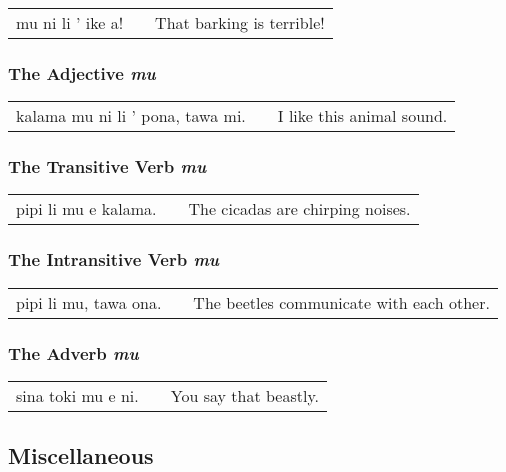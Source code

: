 \begin{supertabular}{p{5,5cm}|ll}
    mu ni li ' ike a! &  & That barking is terrible! \\
\end{supertabular}

\subsubsection*{The Adjective  \textit{mu}}

\begin{supertabular}{p{5,5cm}|ll}
    kalama mu ni li ' pona, tawa mi. &  & I like this animal sound. \\
\end{supertabular}

\subsubsection*{The Transitive Verb \textit{mu}}

\begin{supertabular}{p{5,5cm}|ll}
    pipi li mu e kalama. &  & The cicadas are chirping noises. \\
\end{supertabular}

\subsubsection*{The Intransitive Verb \textit{mu}}

\begin{supertabular}{p{5,5cm}|ll}
    pipi li mu, tawa ona. &  & The beetles communicate with each other. \\
\end{supertabular}

\subsubsection*{The Adverb \textit{mu}}

\begin{supertabular}{p{5,5cm}|ll}
    sina toki mu e ni. &  & You say that beastly. \\
\end{supertabular}

\subsection*{Miscellaneous}
